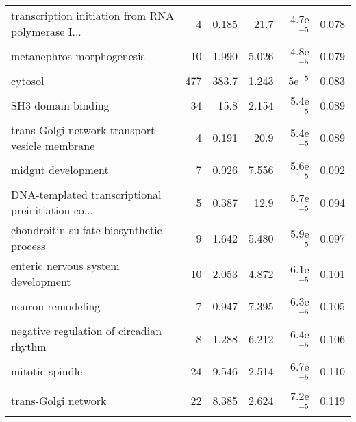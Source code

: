 \begin{longtable}{lrrrrr}
 transcription initiation from RNA polymerase I... &                       4 &                   0.185 &       21.7 &          4.7e$^{-5}$ &                0.078 \\
                         metanephros morphogenesis &                      10 &                   1.990 &      5.026 &          4.8e$^{-5}$ &                0.079 \\
                                           cytosol &                     477 &                   383.7 &      1.243 &            5e$^{-5}$ &                0.083 \\
                                SH3 domain binding &                      34 &                    15.8 &      2.154 &          5.4e$^{-5}$ &                0.089 \\
    trans-Golgi network transport vesicle membrane &                       4 &                   0.191 &       20.9 &          5.4e$^{-5}$ &                0.089 \\
                                midgut development &                       7 &                   0.926 &      7.556 &          5.6e$^{-5}$ &                0.092 \\
 DNA-templated transcriptional preinitiation co... &                       5 &                   0.387 &       12.9 &          5.7e$^{-5}$ &                0.094 \\
          chondroitin sulfate biosynthetic process &                       9 &                   1.642 &      5.480 &          5.9e$^{-5}$ &                0.097 \\
                enteric nervous system development &                      10 &                   2.053 &      4.872 &          6.1e$^{-5}$ &                0.101 \\
                                 neuron remodeling &                       7 &                   0.947 &      7.395 &          6.3e$^{-5}$ &                0.105 \\
           negative regulation of circadian rhythm &                       8 &                   1.288 &      6.212 &          6.4e$^{-5}$ &                0.106 \\
                                   mitotic spindle &                      24 &                   9.546 &      2.514 &          6.7e$^{-5}$ &                0.110 \\
                               trans-Golgi network &                      22 &                   8.385 &      2.624 &          7.2e$^{-5}$ &                0.119 \\

\end{longtable}
